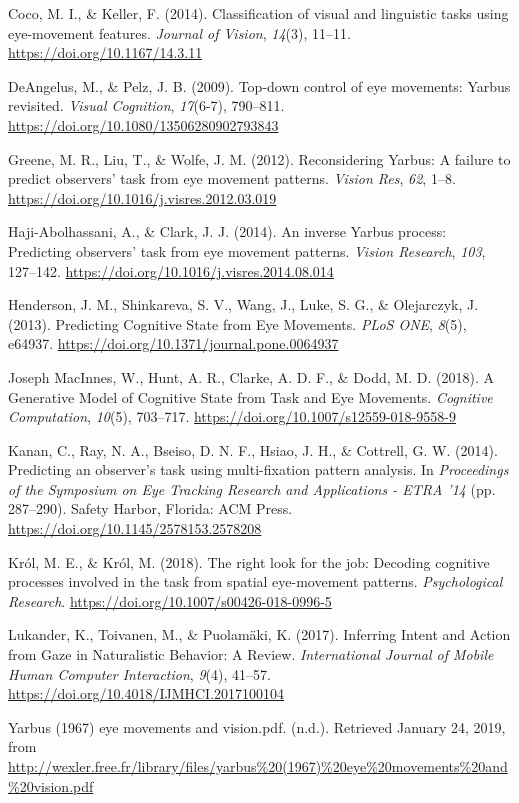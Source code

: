 \documentclass[
  english,
  man]{apa6}
\begin{document}
\leavevmode\hypertarget{ref-cocoClassificationVisualLinguistic2014}{}%
Coco, M. I., \& Keller, F. (2014). Classification of visual and linguistic tasks using eye-movement features. \emph{Journal of Vision}, \emph{14}(3), 11--11. \url{https://doi.org/10.1167/14.3.11}

\leavevmode\hypertarget{ref-deangelusTopdownControlEye2009}{}%
DeAngelus, M., \& Pelz, J. B. (2009). Top-down control of eye movements: Yarbus revisited. \emph{Visual Cognition}, \emph{17}(6-7), 790--811. \url{https://doi.org/10.1080/13506280902793843}

\leavevmode\hypertarget{ref-greeneReconsideringYarbusFailure2012a}{}%
Greene, M. R., Liu, T., \& Wolfe, J. M. (2012). Reconsidering Yarbus: A failure to predict observers' task from eye movement patterns. \emph{Vision Res}, \emph{62}, 1--8. \url{https://doi.org/10.1016/j.visres.2012.03.019}

\leavevmode\hypertarget{ref-haji-abolhassaniInverseYarbusProcess2014}{}%
Haji-Abolhassani, A., \& Clark, J. J. (2014). An inverse Yarbus process: Predicting observers' task from eye movement patterns. \emph{Vision Research}, \emph{103}, 127--142. \url{https://doi.org/10.1016/j.visres.2014.08.014}

\leavevmode\hypertarget{ref-hendersonPredictingCognitiveState2013a}{}%
Henderson, J. M., Shinkareva, S. V., Wang, J., Luke, S. G., \& Olejarczyk, J. (2013). Predicting Cognitive State from Eye Movements. \emph{PLoS ONE}, \emph{8}(5), e64937. \url{https://doi.org/10.1371/journal.pone.0064937}

\leavevmode\hypertarget{ref-josephmacinnesGenerativeModelCognitive2018}{}%
Joseph MacInnes, W., Hunt, A. R., Clarke, A. D. F., \& Dodd, M. D. (2018). A Generative Model of Cognitive State from Task and Eye Movements. \emph{Cognitive Computation}, \emph{10}(5), 703--717. \url{https://doi.org/10.1007/s12559-018-9558-9}

\leavevmode\hypertarget{ref-kananPredictingObserverTask2014}{}%
Kanan, C., Ray, N. A., Bseiso, D. N. F., Hsiao, J. H., \& Cottrell, G. W. (2014). Predicting an observer's task using multi-fixation pattern analysis. In \emph{Proceedings of the Symposium on Eye Tracking Research and Applications - ETRA '14} (pp. 287--290). Safety Harbor, Florida: ACM Press. \url{https://doi.org/10.1145/2578153.2578208}

\leavevmode\hypertarget{ref-krolRightLookJob2018}{}%
Król, M. E., \& Król, M. (2018). The right look for the job: Decoding cognitive processes involved in the task from spatial eye-movement patterns. \emph{Psychological Research}. \url{https://doi.org/10.1007/s00426-018-0996-5}

\leavevmode\hypertarget{ref-lukanderInferringIntentAction2017}{}%
Lukander, K., Toivanen, M., \& Puolamäki, K. (2017). Inferring Intent and Action from Gaze in Naturalistic Behavior: A Review. \emph{International Journal of Mobile Human Computer Interaction}, \emph{9}(4), 41--57. \url{https://doi.org/10.4018/IJMHCI.2017100104}

\leavevmode\hypertarget{ref-Yarbus1967Eye}{}%
Yarbus (1967) eye movements and vision.pdf. (n.d.). Retrieved January 24, 2019, from \url{http://wexler.free.fr/library/files/yarbus\%20(1967)\%20eye\%20movements\%20and\%20vision.pdf}

\endgroup
\end{document}
